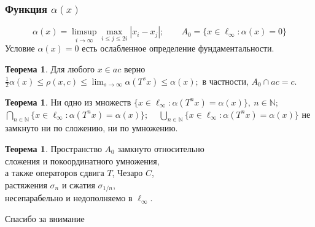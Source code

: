 \documentclass[10pt,pdf,hyperref={unicode},aspectratio=169]{beamer}
\theoremstyle{definition}
\newtheorem{ttheorem}[llemma]{Теорема}
\begin{document}
\begin{frame}
	\frametitle{Функция $\alpha(x)$}
	\begin{equation*}
		\alpha(x) = \limsup_{i\to\infty} \max_{i \leq j \leq 2i} |x_i-x_j|
		;\qquad
		A_0 = \{x\in\ell_\infty : \alpha(x) = 0\}
	\end{equation*}
	Условие $\alpha(x) = 0$ есть ослабленное определение фундаментальности.

	\begin{ttheorem}
		Для любого $x\in ac$ верно
		$\displaystyle
			\frac{1}{2} \alpha(x) \leq \rho(x,c)\leq \lim_{s\to\infty} \alpha(T^s x) \leq \alpha(x)
			;
		$
		в частности, $A_0 \cap ac = c$.
	\end{ttheorem}


	\begin{ttheorem}
		Ни одно из множеств
		$\displaystyle
			\{x \in \ell_\infty : \alpha(T^n x) = \alpha(x) \}, ~n\in\mathbb{N};
		$~
		$\displaystyle
			\bigcap\limits_{n\in\mathbb{N}}\{x \in \ell_\infty : \alpha(T^n x) = \alpha(x) \};
		$ ~
		$\displaystyle
			\bigcup_{n\in\mathbb{N}}\{x \in \ell_\infty : \alpha(T^n x) = \alpha(x) \}
		$ не замкнуто ни по сложению, ни по умножению.
	\end{ttheorem}

	\begin{ttheorem}
		Пространство $A_0$ замкнуто относительно
		\\
		сложения и покоординатного умножения,
		\\
		а также операторов сдвига $T$, Чезаро $C$,
		\\
		растяжения $\sigma_n$ и сжатия $\sigma_{1/n}$,
		\\
		несепарабельно и недополняемо в $\ell_\infty$.
	\end{ttheorem}

\end{frame}




\begin{frame}
	\huge\centering
	Спасибо за внимание
\end{frame}
\end{document}
